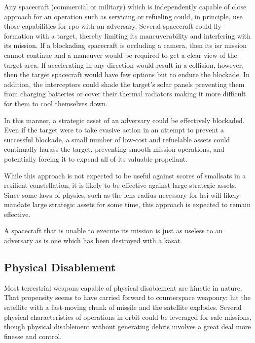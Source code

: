 Any spacecraft (commercial or military) which is independently capable
of close approach for an operation such as servicing or refueling
could, in principle, use those capabilities for \ac{rpo} with an
adversary.  Several spacecraft could fly formation with a target,
thereby limiting its maneuverability and interfering with its mission.
If a blockading spacecraft is occluding a camera, then its \ac{isr}
mission cannot continue and a maneuver would be required to get a
clear view of the target area.  If accelerating in any direction would
result in a collision, however, then the target spacecraft would have
few options but to endure the blockade.  In addition, the interceptors
could shade the target's solar panels preventing them from charging
batteries or cover their thermal radiators making it more difficult
for them to cool themselves down.

In this manner, a strategic asset of an adversary could be effectively
blockaded.  Even if the target were to take evasive action in an
attempt to prevent a successful blockade, a small number of low-cost
and refuelable assets could continually harass the target, preventing
smooth mission operations, and potentially forcing it to expend all of
its valuable propellant.

While this approach is not expected to be useful against scores of
smallsats in a resilient constellation, it is likely to be effective
against large strategic assets. Since some laws of physics, such as
the lens radius necessary for \acf{hsi} will likely mandate large
strategic assets for some time, this approach is expected to remain
effective.

A spacecraft that is unable to execute its mission is just as useless
to an adversary as is one which has been destroyed with a \ac{kasat}.

\subsection{Physical Disablement}
Most terrestrial weapons capable of physical disablement are kinetic
in nature.  That propensity seems to have carried forward to
counterspace weaponry: hit the satellite with a fast-moving chunk of
missile and the satellite explodes.  Several physical characteristics
of operations in orbit could be leveraged for \ac{safe} missions,
though physical disablement without generating debris involves a great
deal more finesse and control.

